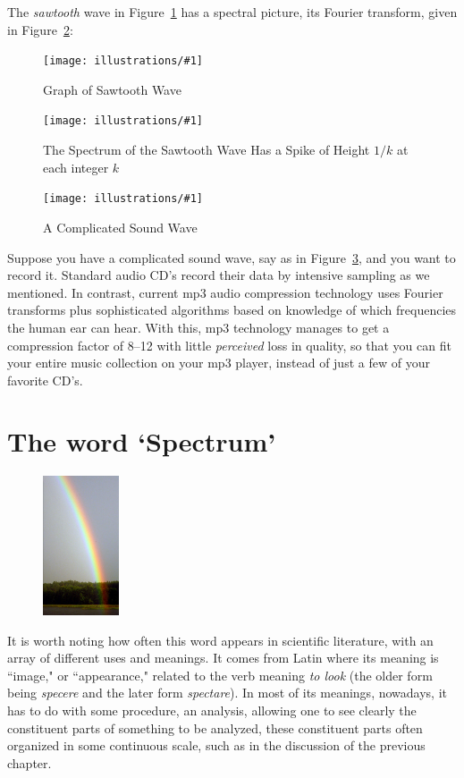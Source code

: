 \documentclass[openany]{book}
\newcommand{\ill}[3]{%
   \begin{figure}[H]%
   \vspace{-2ex}
   \centering%
   \texttt{[image: illustrations/\#1]}%
   \caption{#3}%
   \vspace{-2ex}
    \end{figure}}
\theoremstyle{plain}
\theoremstyle{definition}
\begin{document}
{{The {\em sawtooth} wave in Figure~\ref{fig:sawtooth} has a spectral picture, its Fourier transform, given in Figure~\ref{fig:sawtooth-spectrum}:

   \ill{sawtooth}{.7}{Graph of Sawtooth Wave\label{fig:sawtooth}}
   \ill{sawtooth-spectrum}{.6}{The Spectrum of the Sawtooth Wave Has a Spike of Height $1/k$ at
each integer $k$\label{fig:sawtooth-spectrum}}



 \ill{complicated-wave}{.6}{A Complicated Sound Wave\label{fig:complicated-wave}}

Suppose you have a complicated sound wave, say as in
Figure~\ref{fig:complicated-wave}, and you want to record it.
Standard audio CD's record their data by intensive sampling as we
mentioned. In contrast, current mp3 audio compression technology uses
Fourier transforms plus sophisticated algorithms based on
knowledge of which frequencies the human ear can hear.
With this, mp3 technology manages to
get a compression factor of 8--12 with little {\em perceived} loss in
quality, so that you can fit your entire music collection on your
mp3 player, instead of just a few of your favorite CD's.

\chapter{The word `Spectrum'}

\begin{figure}
    \includegraphics[width=0.2\textwidth]{illustrations/rainbow}
\end{figure}

  It is worth noting how often this word appears in scientific literature, with an array of different uses and meanings.   It  comes from Latin where its meaning is ``image," or ``appearance," related to the verb meaning {\it to look} (the older form being  {\it specere} and the later form {\it spectare}).  In most of its meanings, nowadays, it has to do with some procedure, an analysis, allowing one to see clearly the  constituent parts of something to be analyzed, these constituent parts often organized in some continuous scale, such as in the discussion of the previous chapter.

}}
\end{document}
